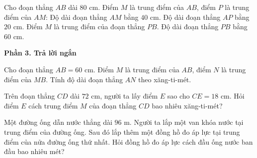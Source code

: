 \begin{ex} %
Cho đoạn thẳng $AB$ dài $80\text{ cm}$. Điểm $M$ là trung điểm của $AB$, điểm $P$ là trung điểm của $AM$:
\choiceTF
{\True Độ dài đoạn thẳng $AM$ bằng $40\text{ cm}$.}
{\True Độ dài đoạn thẳng $AP$ bằng $20\text{ cm}$.}
{Điểm $M$ là trung điểm của đoạn thẳng $PB$.}
{\True Độ dài đoạn thẳng $PB$ bằng $60\text{ cm}$.}
\end{ex}

\textbf{Phần 3. Trả lời ngắn}

\begin{ex} %
Cho đoạn thẳng $AB = 60\text{ cm}$. Điểm $M$ là trung điểm của $AB$, điểm $N$ là trung điểm của $MB$. Tính độ dài đoạn thẳng $AN$ theo xăng-ti-mét.
\end{ex}

\begin{ex} %
Trên đoạn thẳng $CD$ dài $72\text{ cm}$, người ta lấy điểm $E$ sao cho $CE = 18\text{ cm}$. Hỏi điểm $E$ cách trung điểm $M$ của đoạn thẳng $CD$ bao nhiêu xăng-ti-mét?
\end{ex}

\begin{ex} %
Một đường ống dẫn nước thẳng dài $96\text{ m}$. Người ta lắp một van khóa nước tại trung điểm của đường ống. Sau đó lắp thêm một đồng hồ đo áp lực tại trung điểm của nửa đường ống thứ nhất. Hỏi đồng hồ đo áp lực cách đầu ống nước ban đầu bao nhiêu mét?
\end{ex}

